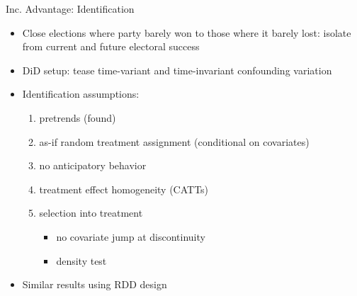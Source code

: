 \documentclass{beamer}
\begin{document}
\begin{frame}[label=mechanism_identification]{Inc. Advantage: Identification}
\begin{itemize}
	\item Close elections where party barely won to those where it barely lost: isolate from current and future electoral success
	\item DiD setup: tease time-variant and time-invariant confounding variation
	\item Identification assumptions: 
	\begin{enumerate}
		\item pretrends (found)
		\item as-if random treatment assignment (conditional on covariates)
		\item no anticipatory behavior  \hyperlink{event_by_event_figure2}{}
		\item treatment effect homogeneity (CATTs)
		\item selection into treatment
		\begin{itemize}
		\item no covariate jump at discontinuity \hyperlink{population}{} 
		\item density test \hyperlink{mccrary_test}{} 
		\end{itemize} 
	\end{enumerate} 
\item Similar results using RDD design \hyperlink{rdd_figure}{} \hyperlink{rdd_table}{} 
 

\end{itemize}
 
\end{frame} 
\end{document}
